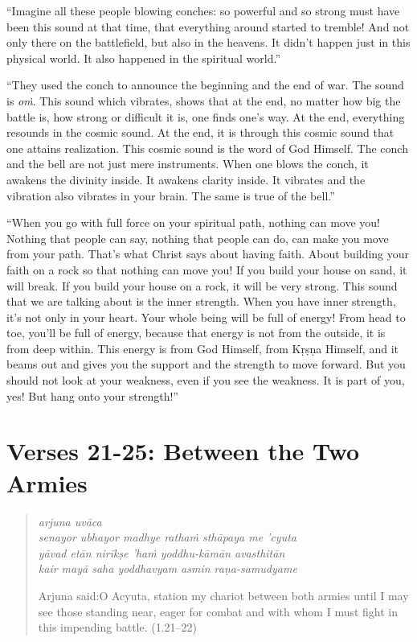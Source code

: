 \documentclass[12pt, twoside, openright]{memoir}
\begin{document}
\enquote{Imagine all these people blowing conches: so powerful and so strong must have been this sound at that time, that everything around started to tremble! And not only there on the battlefield, but also in the heavens. It didn’t happen just in this physical world. It also happened in the spiritual world.}


\enquote{They used the conch to announce the beginning and the end of war. The sound is \textit{oṁ}. This sound which vibrates, shows that at the end, no matter how big the battle is, how strong or difficult it is, one finds one’s way. At the end, everything resounds in the cosmic sound. At the end, it is through this cosmic sound that one attains realization. This cosmic sound is the word of God Himself. The conch and the bell are not just mere instruments. When one blows the conch, it awakens the divinity inside. It awakens clarity inside. It vibrates and the vibration also vibrates in your brain. The same is true of the bell.}

\enquote{When you go with full force on your spiritual path, nothing can move you! Nothing that people can say, nothing that people can do, can make you move from your path. That’s what Christ says about having faith. About building your faith on a rock so that nothing can move you! If you build your house on sand, it will break. If you build your house on a rock, it will be very strong. This sound that we are talking about is the inner strength. When you have inner strength, it’s not only in your heart. Your whole being will be full of energy! From head to toe, you’ll be full of energy, because that energy is not from the outside, it is from deep within. This energy is from God Himself, from Kṛṣṇa Himself, and it beams out and gives you the support and the strength to move forward. But you should not look at your weakness, even if you see the weakness. It is part of you, yes! But hang onto your strength!}

\newpage
\section{Verses 21-25: Between the Two Armies}\label{sec-verses-21-25-between-the-two-armies}


\par
\begin{verse}
\textit{arjuna uvāca} \\
\textit{senayor ubhayor madhye rathaṁ sthāpaya me ’cyuta} \\
\textit{yāvad etān nirīkṣe ’haṁ yoddhu-kāmān avasthitān} \\
\textit{kair mayā saha yoddhavyam asmin raṇa-samudyame}

\noindent \quad Arjuna said:\linebreak O Acyuta, station my chariot between both armies until I may see those standing near, eager for combat and with whom I must fight in this impending battle. (1.21–22)
\end{verse}
\par
\end{document}
